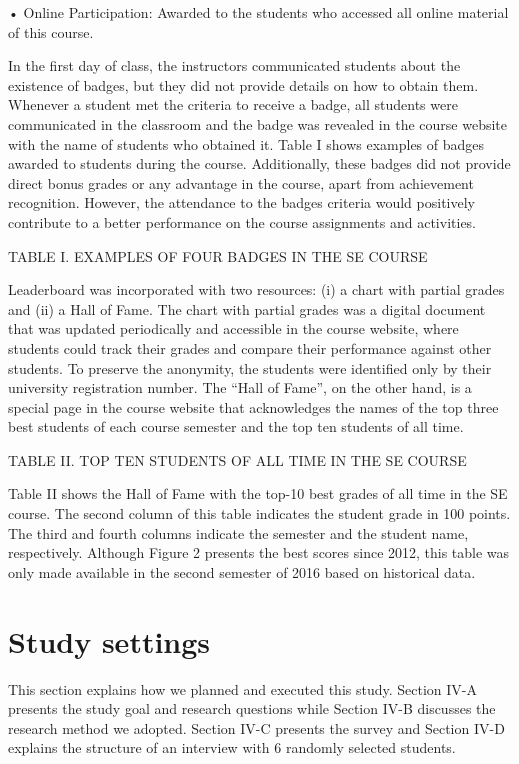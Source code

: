 •	Online Participation: Awarded to the students who accessed all online material of this course. 

In the first day of class, the instructors communicated students about the existence of badges, but they did not provide details on how to obtain them. Whenever a student met the criteria to receive a badge, all students were communicated in the classroom and the badge was revealed in the course website with the name of students who obtained it. Table I shows examples of badges awarded to students during the course. Additionally, these badges did not provide direct bonus grades or any advantage in the course, apart from achievement recognition. However, the attendance to the badges criteria would positively contribute to a better performance on the course assignments and activities.

TABLE I. 	EXAMPLES OF FOUR BADGES IN THE SE COURSE

Leaderboard was incorporated with two resources: (i) a chart with partial grades and (ii) a Hall of Fame. The chart with partial grades was a digital document that was updated periodically and accessible in the course website, where students could track their grades and compare their performance against other students. To preserve the anonymity, the students were identified only by their university registration number. The “Hall of Fame”, on the other hand, is a special page in the course website that acknowledges the names of the top three best students of each course semester and the top ten students of all time. 

TABLE II. 	TOP TEN STUDENTS OF ALL TIME IN THE SE COURSE

Table II shows the Hall of Fame with the top-10 best grades of all time in the SE course. The second column of this table indicates the student grade in 100 points. The third and fourth columns indicate the semester and the student name, respectively. Although Figure 2 presents the best scores since 2012, this table was only made available in the second semester of 2016 based on historical data.

\section{Study settings}

This section explains how we planned and executed this study. Section IV-A presents the study goal and research questions while Section IV-B discusses the research method we adopted. Section IV-C presents the survey and Section IV-D explains the structure of an interview with 6 randomly selected students.

